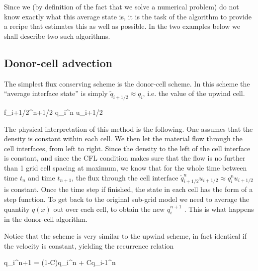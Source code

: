 
 
Since we (by definition of the fact that we solve a numerical problem) do not know exactly what
this average state is, it is the task of the algorithm to provide a recipe that estimates this as well
as possible. In the two examples below we shall describe two such algorithms.
 


\subsection{Donor-cell advection}

The simplest flux conserving scheme is the donor-cell scheme. In this scheme the ``average
interface state'' is simply $\tilde{q}_{i+1/2} \approx q_i$, i.e. the value of the
upwind cell. 

\beq
f_{i+1/2}^{n+1/2} \approx q_i^n u_{i+1/2}
\eeq

The physical interpretation of this method is the following. One assumes that the density is
constant within each cell. We then let the material flow through the cell interfaces, from left to
right. Since the density to the left of the cell interface is constant, and since the
CFL condition makes sure that the flow is no further than 1 grid cell spacing at maximum, we
know that for the whole time between time $t_n$ and time $t_{n+1}$,
the flux through the cell interface $\tilde{q}_{i+1/2} ^n u_{i+1/2}
\approx q_i^n u_{i+1/2}$ is constant. Once the time step if finished, the state
in each cell has the form of a step function. To get back to the original sub-grid model
we need to average the quantity $q(x)$ out over each cell, to obtain the new $q^{n+1}_i$ . This is what
happens in the donor-cell algorithm.

Notice that the scheme is very similar to the upwind scheme, in fact
identical if the velocity is constant, yielding the recurrence
relation

\beq
q_i^{n+1} = (1-C)q_i^n  + Cq_{i-1}^n
\eeq

